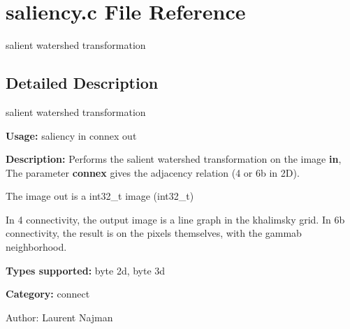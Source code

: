 \section{saliency.c File Reference}
\label{saliency_8c}
salient watershed transformation  




\label{_details}
\subsection{Detailed Description}
salient watershed transformation 

{\bf Usage:} saliency in connex out

{\bf Description:} Performs the salient watershed transformation on the image {\bf in}, The parameter {\bf connex} gives the adjacency relation (4 or 6b in 2D).

The image out is a int32\_\-t image (int32\_\-t)

In 4 connectivity, the output image is a line graph in the khalimsky grid. In 6b connectivity, the result is on the pixels themselves, with the gammab neighborhood.

{\bf Types supported:} byte 2d, byte 3d

{\bf Category:} connect

\begin{Desc}
\item[Author:]Laurent Najman \end{Desc}
